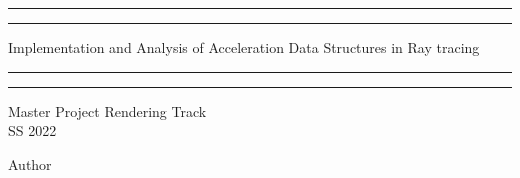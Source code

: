 \documentclass[11pt,a4paper]{article}
\begin{document}
  

\begin{titlepage} %

	\centering %
	
	\scshape %
	
	\vspace*{\baselineskip} %
	
	
	
	\rule{\textwidth}{1.6pt}\vspace*{-\baselineskip}\vspace*{2pt} %
	\rule{\textwidth}{0.4pt} %
	
	\vspace{0.75\baselineskip} %
	
	{\LARGE Implementation and Analysis of Acceleration Data Structures in Ray tracing\\} %
	
	\vspace{0.75\baselineskip} %
	
	\rule{\textwidth}{0.4pt}\vspace*{-\baselineskip}\vspace{3.2pt} %
	\rule{\textwidth}{1.6pt} %
	
	\vspace{2\baselineskip} %
	
	
	Master Project Rendering Track \\ 
	SS 2022 %
	
	\vspace*{3\baselineskip} %
	
	
	Author
	
	\vspace{0.5\baselineskip} %
	

\end{titlepage}
\end{document}
